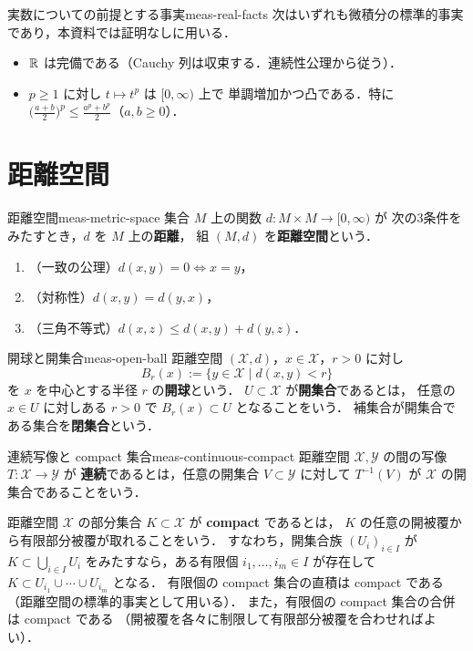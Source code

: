 \begin{remark}{実数についての前提とする事実}{meas-real-facts}
  次はいずれも微積分の標準的事実であり，本資料では証明なしに用いる．
  \begin{itemize}
    \item $\mathbb{R}$ は完備である（Cauchy 列は収束する．連続性公理から従う）．
    \item $p\geq1$ に対し $t\mapsto t^p$ は $[0,\infty)$ 上で
      単調増加かつ凸である．特に
      $\bigl(\frac{a+b}{2}\bigr)^p\leq\frac{a^p+b^p}{2}$（$a,b\geq0$）．
  \end{itemize}
\end{remark}

\section{距離空間}

\begin{definition}{距離空間}{meas-metric-space}
  集合 $M$ 上の関数 $d\colon M\times M\to[0,\infty)$ が
  次の3条件をみたすとき，$d$ を $M$ 上の\textbf{距離}，
  組 $(M,d)$ を\textbf{距離空間}という．
  \begin{enumerate}
    \item （一致の公理）$d(x,y)=0\iff x=y$，
    \item （対称性）$d(x,y)=d(y,x)$，
    \item （三角不等式）$d(x,z)\leq d(x,y)+d(y,z)$．
  \end{enumerate}
\end{definition}

\begin{definition}{開球と開集合}{meas-open-ball}
  距離空間 $(\mathcal{X},d)$，$x\in \mathcal{X}$，$r>0$ に対し
  \[
    B_r(x):=\{y\in \mathcal{X}\mid d(x,y)<r\}
  \]
  を $x$ を中心とする半径 $r$ の\textbf{開球}という．
  $U\subset \mathcal{X}$ が\textbf{開集合}であるとは，
  任意の $x\in U$ に対しある $r>0$ で $B_r(x)\subset U$
  となることをいう．
  補集合が開集合である集合を\textbf{閉集合}という．
\end{definition}

\begin{definition}{連続写像と compact 集合}{meas-continuous-compact}
  距離空間 $\mathcal{X},\mathcal{Y}$ の間の写像 $T\colon \mathcal{X}\to \mathcal{Y}$ が
  \textbf{連続}であるとは，任意の開集合 $V\subset \mathcal{Y}$ に対して
  $T^{-1}(V)$ が $\mathcal{X}$ の開集合であることをいう．

  距離空間 $\mathcal{X}$ の部分集合 $K\subset \mathcal{X}$ が \textbf{compact} であるとは，
  $K$ の任意の開被覆から有限部分被覆が取れることをいう．
  すなわち，開集合族 $(U_i)_{i\in I}$ が
  $K\subset\bigcup_{i\in I}U_i$ をみたすなら，ある有限個
  $i_1,\dots,i_m\in I$ が存在して
  $K\subset U_{i_1}\cup\cdots\cup U_{i_m}$ となる．
  有限個の compact 集合の直積は compact である
  （距離空間の標準的事実として用いる）．
  また，有限個の compact 集合の合併は compact である
  （開被覆を各々に制限して有限部分被覆を合わせればよい）．
\end{definition}


